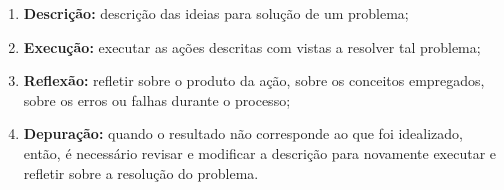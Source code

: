 



\begin{enumerate}
	\item \textbf{Descrição:} descrição das ideias para solução de um problema;
	\item \textbf{Execução:} executar as ações descritas com vistas a resolver tal problema;
	\item \textbf{Reflexão:} refletir sobre o produto da ação, sobre os conceitos empregados, sobre os erros ou falhas durante o processo;
	\item \textbf{Depuração:} quando o resultado não corresponde ao que foi idealizado, então, é necessário revisar e modificar a descrição para novamente executar e refletir sobre a resolução do problema.
\end{enumerate}  


